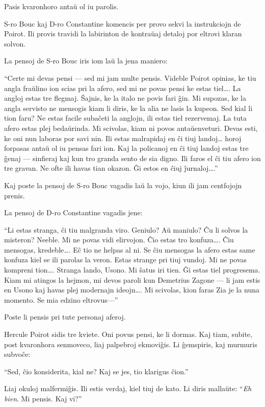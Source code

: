 Pasis kvaronhoro antaŭ ol iu parolis.

S-ro Bouc kaj D-ro Constantine komencis per provo sekvi la instrukciojn de Poirot. Ili provis travidi la labirinton de kontraŭaj detaloj por eltrovi klaran solvon.

La pensoj de S-ro Bouc iris iom laŭ la jena maniero:

``Certe mi devas pensi --- sed mi jam multe pensis. Videble Poirot opinias, ke tiu angla fraŭlino ion scias pri la afero, sed mi ne povas pensi ke estas tiel{\ldots}. La angloj estas tre flegmaj. Ŝajnis, ke la italo ne povis fari ĝin. Mi supozas, ke la angla servisto ne mensogis kiam li diris, ke la alia ne lasis la kupeon. Sed kial li tion faru? Ne estas facile subaĉeti la anglojn, ili estas tiel rezervemaj. La tuta afero estas plej bedaŭrinda. Mi scivolas, kiam ni povos antaŭenveturi. Devas esti, ke oni nun laboras por savi nin. Ili estas malrapidaj en ĉi tiuj landoj{\ldots} horoj forpasas antaŭ ol iu pensas fari ion. Kaj la policanoj en ĉi tiuj landoj estas tre ĝenaj --- sinfieraj kaj kun tro granda sento de sia digno. Ili faros el ĉi tiu afero ion tre gravan. Ne ofte ili havas tian okazon. Ĝi estos en ĉiuj ĵurnaloj{\ldots}.''

Kaj poste la pensoj de S-ro Bouc vagadis laŭ la vojo, kiun ili jam centfojojn prenis.

La pensoj de D-ro Constantine vagadis jene:

``Li estas stranga, ĉi tiu malgranda viro. Geniulo? Aŭ maniulo? Ĉu li solvos la misteron? Neeble. Mi ne povas vidi elirvojon. Ĉio estas tro konfuza{\ldots}. Ĉiu mensogas, kredeble{\ldots}. Eĉ tio ne helpas al ni. Se ĉiu mensogas la afero estas same konfuza kiel se ili parolas la veron. Estas strange pri tiuj vundoj. Mi ne povas kompreni tion{\ldots}. Stranga lando, Usono. Mi ŝatus iri tien. Ĝi estas tiel progresema. Kiam mi atingos la hejmon, mi devos paroli kun Demetrius Zagone --- li jam estis en Usono kaj havas plej modernajn ideojn{\ldots}. Mi scivolas, kion faras Zia je la nuna momento. Se mia edzino eltrovus---''

Poste li pensis pri tute personaj aferoj.

Hercule Poirot sidis tre kviete. Oni povus pensi, ke li dormas. Kaj tiam, subite, post kvaronhora senmoveco, liaj palpebroj ekmoviĝis. Li ĝemspiris, kaj murmuris subvoĉe:

``Sed, ĉio konsiderita, kial ne? Kaj se jes, tio klarigus ĉion.''

Liaj okuloj malfermiĝis. Ili estis verdaj, kiel tiuj de kato. Li diris mallaŭte: ``\emph{Eh bien}. Mi pensis. Kaj vi?''

